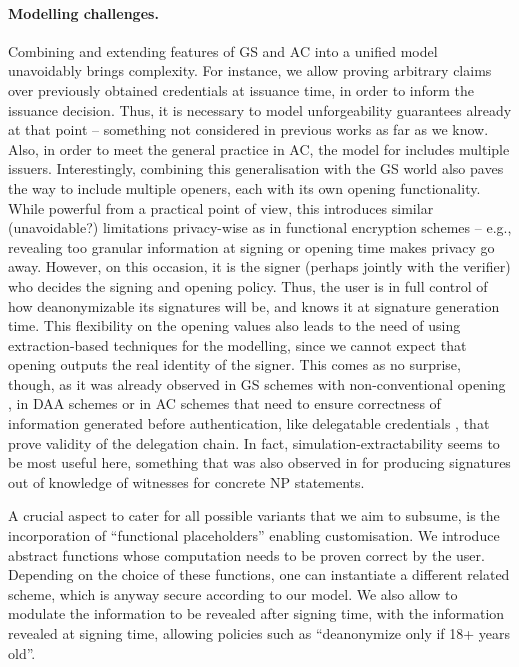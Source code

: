 \paragraph{Modelling challenges.} %
Combining and extending features of GS and AC into a unified model unavoidably
brings complexity. For instance, we allow proving arbitrary claims over
previously obtained credentials at issuance time, in order to inform the
issuance decision. Thus, it is necessary to model unforgeability guarantees
already at that point -- something not considered in previous works as far as
we know. Also, in
order to meet the general practice in AC, the model for \UAS includes multiple
issuers. Interestingly, combining this generalisation with the GS world also
paves the way to include multiple openers, each with its own opening
functionality. While powerful from a practical point of view, this introduces
similar (unavoidable?) limitations privacy-wise as in functional encryption
schemes \cite{bsw11} -- e.g., revealing too granular information at signing or
opening time makes privacy go away. However, on this occasion, it is the signer
(perhaps jointly with the verifier) who decides the signing and
opening policy. Thus, the user is in full control of how deanonymizable its
signatures will be, and knows it at signature generation time. This flexibility
on the opening values also leads to the
need of using extraction-based techniques for the modelling, since we cannot
expect that opening outputs the real identity of the signer. This comes as no
surprise, though, as it was already observed in GS schemes with non-conventional
opening \cite{dl21}, in DAA schemes \cite{cdl16,cdl16b} or in AC schemes that
need to ensure correctness of information generated before authentication, like
delegatable credentials \cite{bcc+09}, that prove validity of the delegation
chain. In fact, simulation-extractability seems to be most useful here,
something that was also observed in \cite{cl06} for producing signatures out of
knowledge of witnesses for concrete NP statements.

A crucial aspect to cater for all possible variants that we aim to subsume, is
the incorporation of ``functional placeholders'' enabling customisation. We
introduce abstract functions whose computation needs to be proven correct by the
user. Depending on the choice of these functions, one can instantiate a
different related scheme, which is anyway secure according to our \UAS model.
We also allow to modulate the information to be revealed after signing time,
with the information revealed at signing time, allowing policies such as
``deanonymize only if 18+ years old''.

